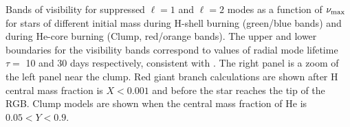 \label{fig:visibility} Bands of visibility for suppressed $\ell=1$ and $\ell=2$ modes as a function of $\nu_{\rm max}$ for stars of different initial mass during H-shell burning (green/blue bands) and during He-core burning (Clump, red/orange bands). The upper and lower boundaries for the visibility bands correspond to values of radial mode lifetime $\tau=$ 10 and 30 days respectively, consistent with \citet{Dupret_2009,Corsaro_2015}. The right panel is a zoom of the left panel near the clump. Red giant branch calculations are shown after H central mass fraction is $ X < 0.001$ and before the star reaches the tip of the RGB. Clump models are shown when the central mass fraction of He is $0.05 < Y < 0.9$.

  
  
  
  
  